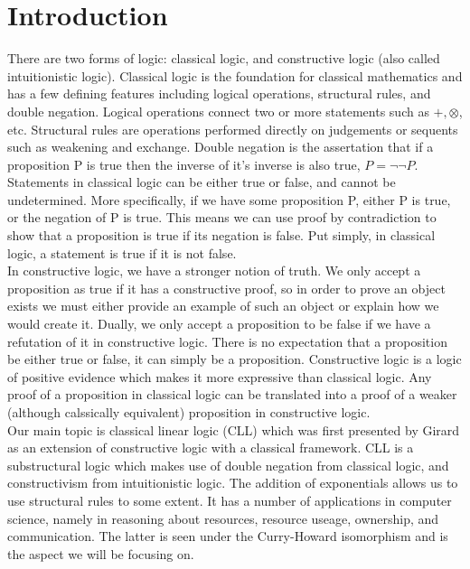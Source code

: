 \chapter{Introduction}
\label{chap: intro}


\noindent
There are two forms of logic: classical logic, and constructive logic (also called intuitionistic logic). 
Classical logic is the foundation for classical mathematics and has a few defining features including 
logical operations, structural rules, and double negation. Logical operations connect two or more statements 
such as $+, \otimes$, etc. Structural rules are operations performed directly on judgements or sequents such 
as weakening and exchange. Double negation is the assertation that if a proposition P is true then the inverse 
of it's inverse is also true, $P = \neg \neg P$. Statements in classical logic can be either 
true or false, and cannot be undetermined. More specifically, if we have some proposition P, either P is 
true, or the negation of P is true. This means we can use proof by contradiction to show that a proposition 
is true if its negation is false. Put simply, in classical logic, a statement is true if it is not false. \\

\noindent
In constructive logic, we have a stronger notion of truth. We only accept a proposition as true if it has a 
constructive proof, so in order to prove an object exists we must either provide an example of such an object or 
explain how we would create it. Dually, we only accept a proposition to be false if we have a refutation of it in 
constructive logic. There is no expectation that a proposition be either true or false, it can simply be a proposition. 
Constructive logic is a logic of positive evidence which makes it more expressive than classical logic. Any 
proof of a proposition in classical logic can be translated into a proof of a weaker (although calssically 
equivalent) proposition in constructive logic. \\

\noindent
Our main topic is classical linear logic (CLL) which was first presented by Girard \cite{girard1987} as an extension of constructive logic 
with a classical framework. CLL is a substructural logic which makes use of double negation from classical logic, and 
constructivism from intuitionistic logic. The addition of exponentials allows us to use structural rules to some extent. 
It has a number of applications in computer science, namely in reasoning about resources, resource useage, ownership, 
and communication. The latter is seen under the Curry-Howard isomorphism and is the aspect we will be focusing on. \\

